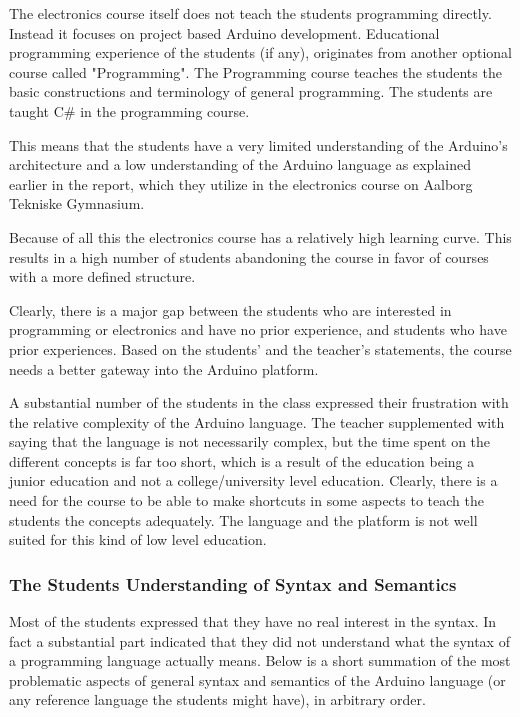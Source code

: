 The electronics course itself does not teach the students programming directly. 
Instead it focuses on project based Arduino development. 
Educational programming experience of the students (if any), originates from another optional course called "Programming". 
The Programming course teaches the students the basic constructions and terminology of general programming. 
The students are taught C{\#} in the programming course. 

This means that the students have a very limited understanding of the Arduino's architecture and a low understanding of the Arduino language as explained earlier in the report, which they utilize in the electronics course on Aalborg Tekniske Gymnasium.

Because of all this the electronics course has a relatively high learning curve. 
This results in a high number of students abandoning the course in favor of courses with a more defined structure.

Clearly, there is a major gap between the students who are interested in programming or electronics and have no prior experience, and students who have prior experiences. 
Based on the students' and the teacher's statements, the course needs a better gateway into the Arduino platform.

A substantial number of the students in the class expressed their frustration with the relative complexity of the Arduino language. 
The teacher supplemented with saying that the language is not necessarily complex, but the time spent on the different concepts is far too short, which is a result of the education being a junior education and not a college/university level education.
Clearly, there is a need for the course to be able to make shortcuts in some aspects to teach the students the concepts adequately. 
The language and the platform is not well suited for this kind of low level education.

\subsubsection{The Students Understanding of Syntax and Semantics}
Most of the students expressed that they have no real interest in the syntax. 
In fact a substantial part indicated that they did not understand what the syntax of a programming language actually means. 
Below is a short summation of the most problematic aspects of general syntax and semantics of the Arduino language (or any reference language the students might have), in arbitrary order.

